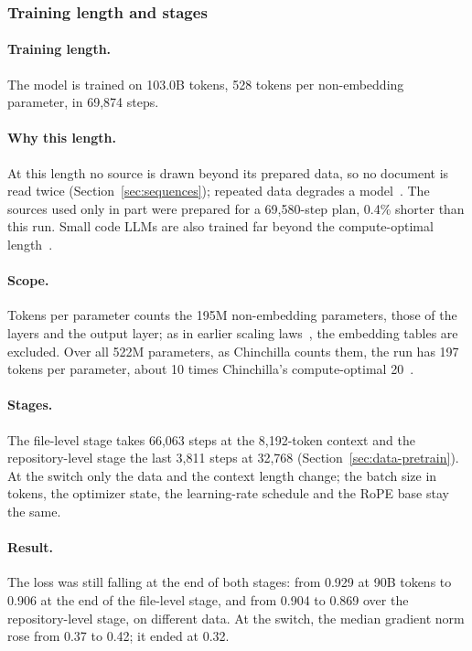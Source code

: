 \documentclass[sigconf,nonacm,balance=false]{acmart}
\begin{document}
\subsubsection{Training length and stages}

\paragraph{Training length.} The model is trained on 103.0B tokens, 528 tokens per non-embedding parameter, in 69,874
steps.

\paragraph{Why this length.} At this length no source is drawn beyond its prepared data, so no document is read twice
(Section~\ref{sec:sequences}); repeated data degrades a model~\cite{hernandez2022repeated}. The sources used only in
part were prepared for a 69,580-step plan, 0.4\% shorter than this run. Small code LLMs are also trained far beyond the
compute-optimal length~\cite{lozhkov2024starcoder2,hui2024qwen25coder}.

\paragraph{Scope.} Tokens per parameter counts the 195M non-embedding parameters, those of the layers and the output
layer; as in earlier scaling laws~\cite{kaplan2020scaling}, the embedding tables are excluded. Over all 522M
parameters, as Chinchilla counts them, the run has 197 tokens per parameter, about 10 times Chinchilla's
compute-optimal 20~\cite{hoffmann2022chinchilla}.

\paragraph{Stages.} The file-level stage takes 66,063 steps at the 8,192-token context and the repository-level stage
the last 3,811 steps at 32,768 (Section~\ref{sec:data-pretrain}). At the switch only the data and the context length
change; the batch size in tokens, the optimizer state, the learning-rate schedule and the RoPE base stay the same.

\paragraph{Result.} The loss was still falling at the end of both stages: from 0.929 at 90B tokens to 0.906 at the
end of the file-level stage, and from 0.904 to 0.869 over the repository-level stage, on different data. At the
switch, the median gradient norm rose from 0.37 to 0.42; it ended at 0.32.
\end{document}

